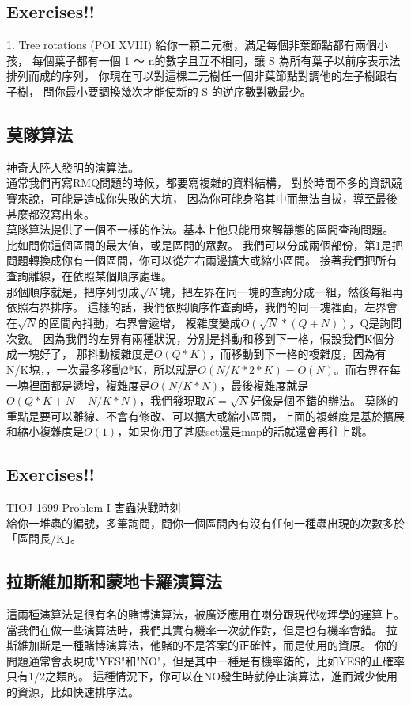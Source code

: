 \documentclass{article}
\begin{document}
\subsection*{Exercises!!}
1. Tree rotations (POI XVIII)
給你一顆二元樹，滿足每個非葉節點都有兩個小孩，
每個葉子都有一個 1 ～ n的數字且互不相同，讓 S 為所有葉子以前序表示法排列而成的序列，
你現在可以對這棵二元樹任一個非葉節點對調他的左子樹跟右子樹，
問你最小要調換幾次才能使新的 S 的逆序數對數最少。

\subsection{莫隊算法}
神奇大陸人發明的演算法。\\
通常我們再寫RMQ問題的時候，都要寫複雜的資料結構，
對於時間不多的資訊競賽來說，可能是造成你失敗的大坑，
因為你可能身陷其中而無法自拔，導至最後甚麼都沒寫出來。\\
莫隊算法提供了一個不一樣的作法。基本上他只能用來解靜態的區間查詢問題。
比如問你這個區間的最大值，或是區間的眾數。
我們可以分成兩個部份，第1是把問題轉換成你有一個區間，你可以從左右兩邊擴大或縮小區間。
接著我們把所有查詢離線，在依照某個順序處理。\\
那個順序就是，把序列切成$\sqrt N$塊，把左界在同一塊的查詢分成一組，然後每組再依照右界排序。
這樣的話，我們依照順序作查詢時，我們的同一塊裡面，左界會在$\sqrt N$的區間內抖動，右界會遞增，
複雜度變成$O(\sqrt N * (Q+N))$，Q是詢問次數。
因為我們的左界有兩種狀況，分別是抖動和移到下一格，假設我們K個分成一塊好了，
那抖動複雜度是$O(Q*K)$，而移動到下一格的複雜度，因為有N/K塊，，一次最多移動2*K，所以就是$O(N/K*2*K) = O(N)$。而右界在每一塊裡面都是遞增，複雜度是$O(N/K*N)$，最後複雜度就是$O(Q*K+N+N/K*N)$，我們發現取$K=\sqrt N$好像是個不錯的辦法。
莫隊的重點是要可以離線、不會有修改、可以擴大或縮小區間，上面的複雜度是基於擴展和縮小複雜度是$O(1)$，如果你用了甚麼set還是map的話就還會再往上跳。
\subsection*{Exercises!!}
TIOJ 1699 Problem I 害蟲決戰時刻\\
給你一堆蟲的編號，多筆詢問，問你一個區間內有沒有任何一種蟲出現的次數多於「區間長/K」。


\subsection{拉斯維加斯和蒙地卡羅演算法}
這兩種演算法是很有名的賭博演算法，被廣泛應用在喇分跟現代物理學的運算上。\\
當我們在做一些演算法時，我們其實有機率一次就作對，但是也有機率會錯。
拉斯維加斯是一種賭博演算法，他賭的不是答案的正確性，而是使用的資原。
你的問題通常會表現成"YES"和"NO"，但是其中一種是有機率錯的，比如YES的正確率只有1/2之類的。
這種情況下，你可以在NO發生時就停止演算法，進而減少使用的資源，比如快速排序法。\\
\end{document}
